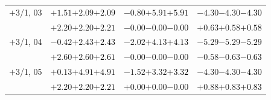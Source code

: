 \documentclass[compress]{beamer}
\begin{document}
\begin{frame}
\begin{tabular}{r | c | c | c}
$+$3/1, 03 & $+1.51$\hspace{0.1 cm}$+2.09$\hspace{0.1 cm}\textcolor{black}{$+2.09$} & $-0.80$\hspace{0.1 cm}$+5.91$\hspace{0.1 cm}\textcolor{black}{$+5.91$} & $-4.30$\hspace{0.1 cm}$-4.30$\hspace{0.1 cm}\textcolor{black}{$-4.30$} \\
           & $+2.20$\hspace{0.1 cm}$+2.20$\hspace{0.1 cm}\textcolor{black}{$+2.21$} & $-0.00$\hspace{0.1 cm}$-0.00$\hspace{0.1 cm}\textcolor{black}{$-0.00$} & $+0.63$\hspace{0.1 cm}$+0.58$\hspace{0.1 cm}\textcolor{black}{$+0.58$} \\
$+$3/1, 04 & $-0.42$\hspace{0.1 cm}$+2.43$\hspace{0.1 cm}\textcolor{black}{$+2.43$} & $-2.02$\hspace{0.1 cm}$+4.13$\hspace{0.1 cm}\textcolor{black}{$+4.13$} & $-5.29$\hspace{0.1 cm}$-5.29$\hspace{0.1 cm}\textcolor{black}{$-5.29$} \\
           & $+2.60$\hspace{0.1 cm}$+2.60$\hspace{0.1 cm}\textcolor{black}{$+2.61$} & $-0.00$\hspace{0.1 cm}$-0.00$\hspace{0.1 cm}\textcolor{black}{$-0.00$} & $-0.58$\hspace{0.1 cm}$-0.63$\hspace{0.1 cm}\textcolor{black}{$-0.63$} \\
$+$3/1, 05 & $+0.13$\hspace{0.1 cm}$+4.91$\hspace{0.1 cm}\textcolor{black}{$+4.91$} & $-1.52$\hspace{0.1 cm}$+3.32$\hspace{0.1 cm}\textcolor{black}{$+3.32$} & $-4.30$\hspace{0.1 cm}$-4.30$\hspace{0.1 cm}\textcolor{black}{$-4.30$} \\
           & $+2.20$\hspace{0.1 cm}$+2.20$\hspace{0.1 cm}\textcolor{black}{$+2.21$} & $+0.00$\hspace{0.1 cm}$+0.00$\hspace{0.1 cm}\textcolor{black}{$-0.00$} & $+0.88$\hspace{0.1 cm}$+0.83$\hspace{0.1 cm}\textcolor{black}{$+0.83$} \\

\end{tabular}
\end{frame}
\end{document}
